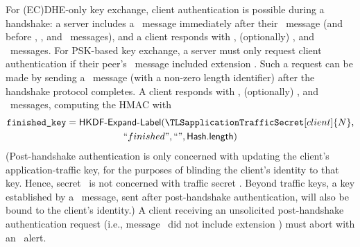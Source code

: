 For (EC)DHE-only key exchange, client authentication is possible during 
a handshake: a server includes a \CertificateRequest\ message immediately 
after their \EncryptedExtensions\ message (and before \Certificate, 
\CertificateVerify, and \Finished\ messages), and a client responds 
with \Certificate, (optionally) \CertificateVerify, and \Finished\ messages. 
For PSK-based key exchange, a server must only request client authentication
if their peer's \ClientHello\ message included extension \TLSpostHandshakeAuth. 
Such a request can be made by sending a \CertificateRequest\ message (with a 
non-zero length identifier) after the handshake protocol completes. A client 
responds with \Certificate, (optionally) \CertificateVerify, and \Finished\ 
messages, computing the HMAC with 
%
\begin{multline*}
  \TLSfinishedKey =   \HKDFExpandLabel( \TLSapplicationTrafficSecret[client]{N},\\
       ``finished", ``", \HashLength)
\end{multline*}
%
(Post-handshake authentication is only concerned with updating the client's 
application-traffic key, for the purposes of blinding the client's identity 
to that key. Hence, secret \TLSfinishedKey\ is not concerned with traffic 
secret \TLSapplicationTrafficSecret[server]{N}. Beyond traffic keys, a key 
established by a \NewSessionTicket\ message, sent after post-handshake 
authentication, will also be bound to the client's identity.)
A client receiving an unsolicited post-handshake authentication request 
(i.e., message \ClientHello\ did not include extension \TLSpostHandshakeAuth) 
must abort with an \TLSunexpectedMessage\ alert.                                          


